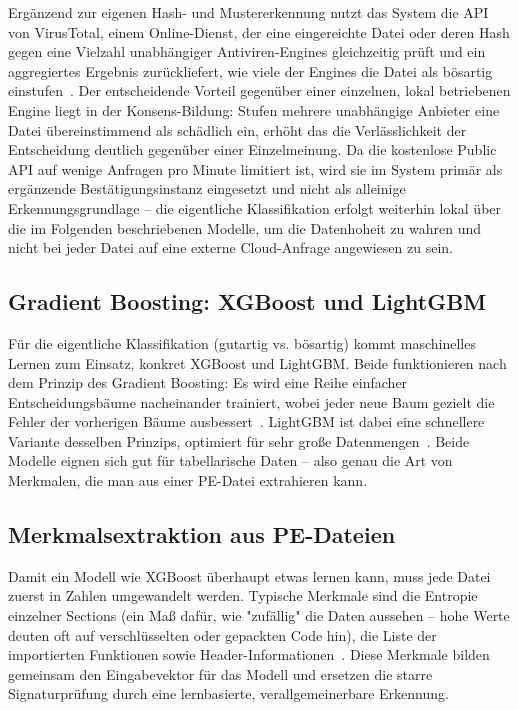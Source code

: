 Ergänzend zur eigenen Hash- und Mustererkennung nutzt das System die
\ac{API} von VirusTotal, einem Online-Dienst, der eine eingereichte
Datei oder deren Hash gegen eine Vielzahl unabhängiger Antiviren-Engines
gleichzeitig prüft und ein aggregiertes Ergebnis zurückliefert, wie viele
der Engines die Datei als bösartig einstufen~\cite{virustotal-docs}. Der
entscheidende Vorteil gegenüber einer einzelnen, lokal betriebenen
Engine liegt in der Konsens-Bildung: Stufen mehrere unabhängige Anbieter
eine Datei übereinstimmend als schädlich ein, erhöht das die
Verlässlichkeit der Entscheidung deutlich gegenüber einer Einzelmeinung.
Da die kostenlose Public API auf wenige Anfragen pro Minute limitiert
ist, wird sie im System primär als ergänzende Bestätigungsinstanz
eingesetzt und nicht als alleinige Erkennungsgrundlage -- die
eigentliche Klassifikation erfolgt weiterhin lokal über die im Folgenden
beschriebenen Modelle, um die Datenhoheit zu wahren und nicht bei jeder
Datei auf eine externe Cloud-Anfrage angewiesen zu sein.

\subsection{Gradient Boosting: XGBoost und LightGBM}

Für die eigentliche Klassifikation (gutartig vs. bösartig) kommt
maschinelles Lernen zum Einsatz, konkret \ac{XGBoost} und
\ac{LightGBM}. Beide funktionieren nach dem Prinzip des Gradient
Boosting: Es wird eine Reihe einfacher Entscheidungsbäume nacheinander
trainiert, wobei jeder neue Baum gezielt die Fehler der vorherigen Bäume
ausbessert~\cite{xgboost-paper}. \ac{LightGBM} ist dabei eine schnellere
Variante desselben Prinzips, optimiert für sehr große
Datenmengen~\cite{lightgbm-paper}. Beide Modelle eignen sich gut für
tabellarische Daten -- also genau die Art von Merkmalen, die man aus
einer \ac{PE}-Datei extrahieren kann.

\subsection{Merkmalsextraktion aus PE-Dateien}

Damit ein Modell wie \ac{XGBoost} überhaupt etwas lernen kann, muss jede
Datei zuerst in Zahlen umgewandelt werden. Typische Merkmale sind die
Entropie einzelner Sections (ein Maß dafür, wie "zufällig" die Daten
aussehen -- hohe Werte deuten oft auf verschlüsselten oder gepackten
Code hin), die Liste der importierten Funktionen sowie
Header-Informationen~\cite{ember-paper}. Diese Merkmale bilden gemeinsam
den Eingabevektor für das Modell und ersetzen die starre
Signaturprüfung durch eine lernbasierte, verallgemeinerbare Erkennung.

